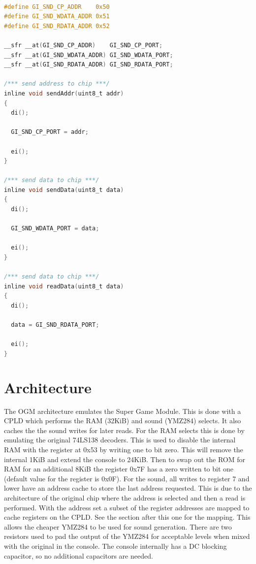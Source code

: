 \begin{lstlisting}[language=C]

#define GI_SND_CP_ADDR    0x50
#define GI_SND_WDATA_ADDR 0x51
#define GI_SND_RDATA_ADDR 0x52

__sfr __at(GI_SND_CP_ADDR)    GI_SND_CP_PORT;
__sfr __at(GI_SND_WDATA_ADDR) GI_SND_WDATA_PORT;
__sfr __at(GI_SND_RDATA_ADDR) GI_SND_RDATA_PORT;

/*** send address to chip ***/
inline void sendAddr(uint8_t addr)
{
  di();

  GI_SND_CP_PORT = addr;

  ei();
}

/*** send data to chip ***/
inline void sendData(uint8_t data)
{
  di();

  GI_SND_WDATA_PORT = data;

  ei();
}

/*** send data to chip ***/
inline void readData(uint8_t data)
{
  di();

  data = GI_SND_RDATA_PORT;

  ei();
}
\end{lstlisting}

\section{Architecture}

\par
The OGM architecture emulates the Super Game Module. This is done with a CPLD which performs the RAM (32KiB) and sound (YMZ284) selects. It also caches the the sound writes for later reads. For the RAM selects this is done by emulating the original 74LS138 decoders. This is used to disable the internal RAM with the register at 0x53 by writing one to bit zero. This will remove the internal 1KiB and extend the console to 24KiB. Then to swap out the ROM for RAM for an additional 8KiB the register 0x7F has a zero written to bit one (default value for the register is 0x0F). For the sound, all writes to register 7 and lower have an address cache to store the last address requested. This is due to the architecture of the original chip where the address is selected and then a read is performed. With the address set a subset of the register addresses are mapped to cache registers on the CPLD. See the section after this one for the mapping. This allows the cheaper YMZ284 to be used for sound generation. There are two resistors used to pad the output of the YMZ284 for acceptable levels when mixed with the original in the console. The console internally has a DC blocking capacitor, so no additional capacitors are needed.

